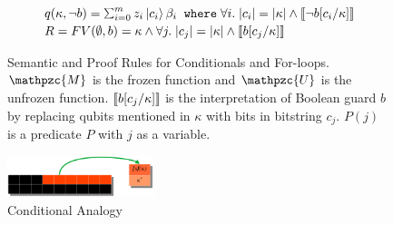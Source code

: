 \begin{figure}[t]
{\begin{mathpar}
  \end{mathpar}
}
{\footnotesize
\[
\begin{array}{l}
q(\kappa,\neg b) = \schai{m}{z_i}{c_{i}}{\beta_i}
\;\;\texttt{where}\;\forall i.\;\slen{c_{i}}=\slen{\kappa}\wedge \denote{\neg b[c_{i}/\kappa]}
\\[0.2em]
R = FV(\emptyset,b)=\kappa \wedge \forall j.\; \slen{c_{j}}=\slen{\kappa}\wedge\denote{b[c_{j}/\kappa]}
\end{array}
\]
}
\caption{Semantic and Proof Rules for Conditionals and For-loops. $\mathpzc{M}$ is the frozen function and $\mathpzc{U}$ is the unfrozen function. $\denote{b[c_{j}/\kappa]}$ is the interpretation of Boolean guard $b$ by replacing qubits mentioned in $\kappa$ with bits in bitstring $c_{j}$.  $P(j)$ is a predicate $P$ with $j$ as a variable. }
\label{fig:qafny-mu-rules}
\end{figure}

\begin{figure}
  \includegraphics[width=0.38\textwidth]{conditional}
  \caption{Conditional Analogy}
\label{fig:qafny-con-analog}
\end{figure} 

